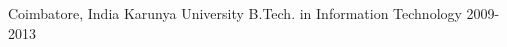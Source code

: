 \begin{cventries}
  \cveducation
    {Coimbatore, India}
    {Karunya University}
    {B.Tech. in Information Technology}
    {2009-2013}
    {
    }
\end{cventries}
